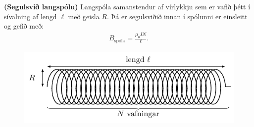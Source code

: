 \ifdefined \wholebook \else\documentclass[oneside]{book}\usepackage{EdlBook}\graphicspath{{figures/}}
\begin{document}

\begin{tcolorbox}
\begin{theorem}
\textbf{(Segulsvið langspólu)} Langspóla samanstendur af vírlykkju sem er vafið þétt í sívalning af lengd $\ell$ með geisla $R$. Þá er segulsviðið innan í spólunni er einsleitt og gefið með:
\begin{align*}
    B_{\text{spóla}} = \frac{\mu_0 I N}{\ell}.
\end{align*}
\end{theorem}
\begin{figure}[H]
    \centering
    \includegraphics{figures/solenoid(1).pdf}
\end{figure}
\end{tcolorbox}
\end{document}
